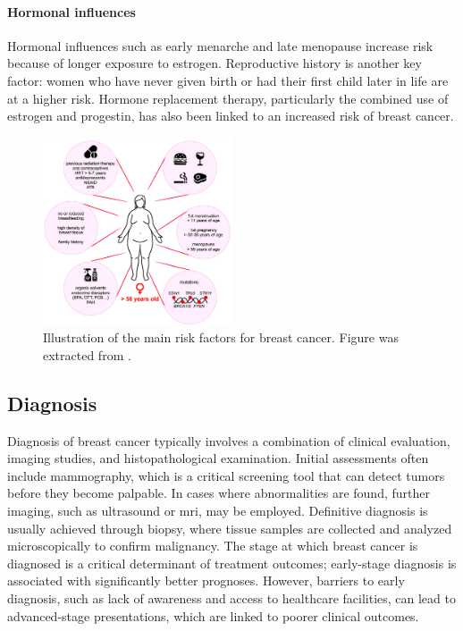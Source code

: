 \paragraph{Hormonal influences}
Hormonal influences such as early menarche and late menopause increase risk
because of longer exposure to estrogen\supercite{nounu_sex_2022}.
Reproductive history is another key factor: women who have never given birth or
had their first child later in life are at a higher
risk\supercite{claudia_admoun_etiology_2022}.
Hormone replacement therapy, particularly the combined use of estrogen and
progestin, has also been linked to an increased risk of breast
cancer\supercite{turner_meta-analysis_2011}.

\begin{figure}[ht]
    \centering

    \includegraphics[width=0.5\textwidth]{chapters/2_background/figures/risk-factors.png}
    \caption{Illustration of the main risk factors for breast cancer.
        Figure was extracted from \textcite{clusan_basic_2023}.
    }
    \label{fig:brca_risk-factors}
\end{figure}

\subsection{Diagnosis}
\label{sec:brca_diagnosis}

Diagnosis of breast cancer typically involves a combination of clinical
evaluation, imaging studies, and histopathological examination.
Initial assessments often include mammography, which is a critical screening
tool that can detect tumors before they become
palpable\supercite{hameed_breast_2020}.
In cases where abnormalities are found, further imaging, such as ultrasound or
\gls{mri}, may be employed.
Definitive diagnosis is usually achieved through biopsy, where tissue samples
are collected and analyzed microscopically to confirm
malignancy\supercite{hameed_breast_2020}.
The stage at which breast cancer is diagnosed is a critical determinant of
treatment outcomes; early-stage diagnosis is associated with significantly
better prognoses\supercite{getachew_perceived_2020}.
However, barriers to early diagnosis, such as lack of awareness and access to
healthcare facilities, can lead to advanced-stage presentations, which are
linked to poorer clinical
outcomes\supercite{getachew_perceived_2020,dickens_stage_2014}.

